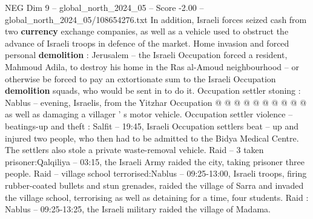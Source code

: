 \begin{textsample}{NEG Dim 9 – global\_north\_2024\_05 – Score -2.00 – global\_north\_2024\_05/108654276.txt}
In addition, Israeli forces seized cash from two \textbf{currency} exchange companies, as well as a vehicle used to obstruct the advance of Israeli troops in defence of the market.
Home invasion and forced personal \textbf{demolition} : Jerusalem -- the Israeli Occupation forced a resident, Mahmoud Adila, to destroy his home in the Ras al-Amoud neighbourhood -- or otherwise be forced to pay an extortionate sum to the Israeli Occupation \textbf{demolition} squads, who would be sent in to do it.
Occupation settler stoning : Nablus -- evening, Israelis, from the Yitzhar Occupation @ @ @ @ @ @ @ @ @ @ as well as damaging a villager ' s motor vehicle.
Occupation settler violence -- beatings-up and theft : Salfit -- 19:45, Israeli Occupation settlers beat -- up and injured two people, who then had to be admitted to the Bidya Medical Centre.
The settlers also stole a private waste-removal vehicle.
Raid -- 3 taken prisoner:Qalqiliya -- 03:15, the Israeli Army raided the city, taking prisoner three people.
Raid -- village school terrorised:Nablus -- 09:25-13:00, Israeli troops, firing rubber-coated bullets and stun grenades, raided the village of Sarra and invaded the village school, terrorising as well as detaining for a time, four students.
Raid : Nablus -- 09:25-13:25, the Israeli military raided the village of Madama.

\end{textsample}
